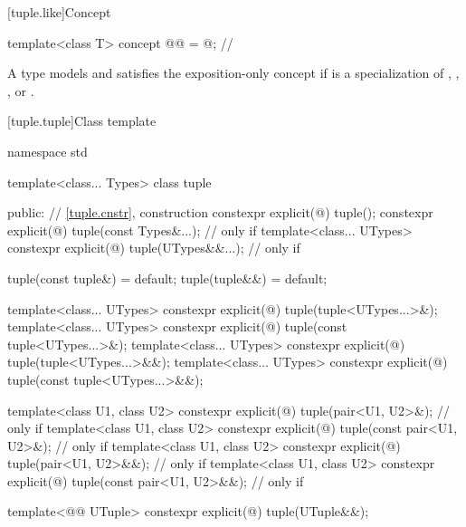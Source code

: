 [tuple.like]{Concept }

\begin{itemdecl}
template<class T>
  concept @@ = @\seebelownc@;           // \expos
\end{itemdecl}

\begin{itemdescr}
\pnum
A type  models and satisfies
the exposition-only concept 
if  is a specialization of
, , , or .
\end{itemdescr}

[tuple.tuple]{Class template }
%

\begin{codeblock}
namespace std {
  template<class... Types>
  class tuple {
  public:
    // \ref{tuple.cnstr},  construction
    constexpr explicit(@\seebelow@) tuple();
    constexpr explicit(@\seebelow@) tuple(const Types&...);         // only if 
    template<class... UTypes>
      constexpr explicit(@\seebelow@) tuple(UTypes&&...);           // only if 

    tuple(const tuple&) = default;
    tuple(tuple&&) = default;

    template<class... UTypes>
      constexpr explicit(@\seebelow@) tuple(tuple<UTypes...>&);
    template<class... UTypes>
      constexpr explicit(@\seebelow@) tuple(const tuple<UTypes...>&);
    template<class... UTypes>
      constexpr explicit(@\seebelow@) tuple(tuple<UTypes...>&&);
    template<class... UTypes>
      constexpr explicit(@\seebelow@) tuple(const tuple<UTypes...>&&);

    template<class U1, class U2>
      constexpr explicit(@\seebelow@) tuple(pair<U1, U2>&);         // only if 
    template<class U1, class U2>
      constexpr explicit(@\seebelow@) tuple(const pair<U1, U2>&);   // only if 
    template<class U1, class U2>
      constexpr explicit(@\seebelow@) tuple(pair<U1, U2>&&);        // only if 
    template<class U1, class U2>
      constexpr explicit(@\seebelow@) tuple(const pair<U1, U2>&&);  // only if 

    template<@@ UTuple>
      constexpr explicit(@\seebelow@) tuple(UTuple&&);

}}
\end{codeblock}
